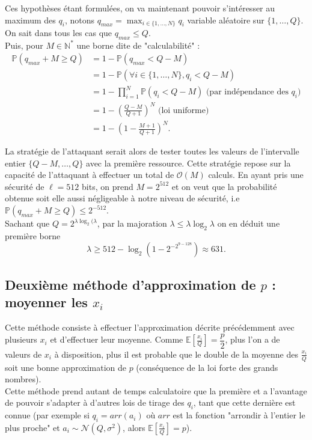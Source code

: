 \documentclass{article}
\newcommand{\bE}{\mathbb{E}}
\begin{document}
Ces hypothèses étant formulées, on va maintenant pouvoir s'intéresser au maximum des $q_i$, notons $q_{max} = \displaystyle\max_{i\in \{1,\dots,N\}}q_i$ variable aléatoire sur $\{1,\dots,Q\}$. On sait dans tous les cas que $q_{max} \leq Q$.\\
Puis, pour $M\in \mathbb{N}^*$ une borne dite de "calculabilité" :
\begin{align*}
\mathbb{P}(q_{max}+M\geq Q) &= 1 - \mathbb{P}(q_{max} < Q-M)\\
&= 1-\mathbb{P}(\forall i \in \{1,\dots,N\}, q_i < Q-M)\\
&=1-\prod_{i=1}^{N}\mathbb{P}(q_i < Q-M) \text{ (par indépendance des }q_i\text{)}\\
&=1-\left(\frac{Q-M}{Q+1}\right)^{N}\text{ (loi uniforme)}\\
&= 1-\left(1-\frac{M+1}{Q+1}\right)^{N}.
\end{align*}

La stratégie de l'attaquant serait alors de tester toutes les valeurs de l'intervalle entier $\{Q-M,\dots,Q\}$ avec la première ressource. Cette stratégie repose sur la capacité de l'attaquant à effectuer un total de $\mathcal{O}(M)$ calculs.
En ayant pris une sécurité de $\ell = 512$ bits, on prend $M = 2^{512}$ et on veut que la probabilité obtenue soit elle aussi négligeable à notre niveau de sécurité, i.e $\mathbb{P}(q_{max}+M\geq Q) \leq 2^{-512}$.\\
Sachant que $Q = 2^{\lambda \log_2(\lambda}$, par la majoration $\lambda \leq \lambda \log_2 \lambda$ on en déduit une première borne \[\lambda \geq 512 - \log_2(1-2^{-2^{9-128}}) \approx 631.\]

\subsection{Deuxième méthode d'approximation de $p$ : moyenner les $x_i$}

Cette méthode consiste à effectuer l'approximation décrite précédemment avec plusieurs $x_i$ et d'effectuer leur moyenne. Comme $\bE\left[\displaystyle \frac{x_i}{Q}\right] = \dfrac{p}{2}$, plus l'on a de valeurs de $x_i$ à disposition, plus il est probable que le double de la moyenne des $\displaystyle \frac{x_i}{Q}$ soit une bonne approximation de $p$ (conséquence de la loi forte des grands nombres).\\
Cette méthode prend autant de temps calculatoire que la première et a l'avantage de pouvoir s'adapter à d'autres lois de tirage des $q_i$, tant que cette dernière est connue (par exemple si $q_i =  arr(a_i)$ où $arr$ est la fonction "arrondir à l'entier le plus proche" et $a_i \sim \mathcal{N}(Q,\sigma^2)$, alors $\bE\left[\displaystyle\frac{x_i}{Q}\right] = p$).\\
\end{document}
